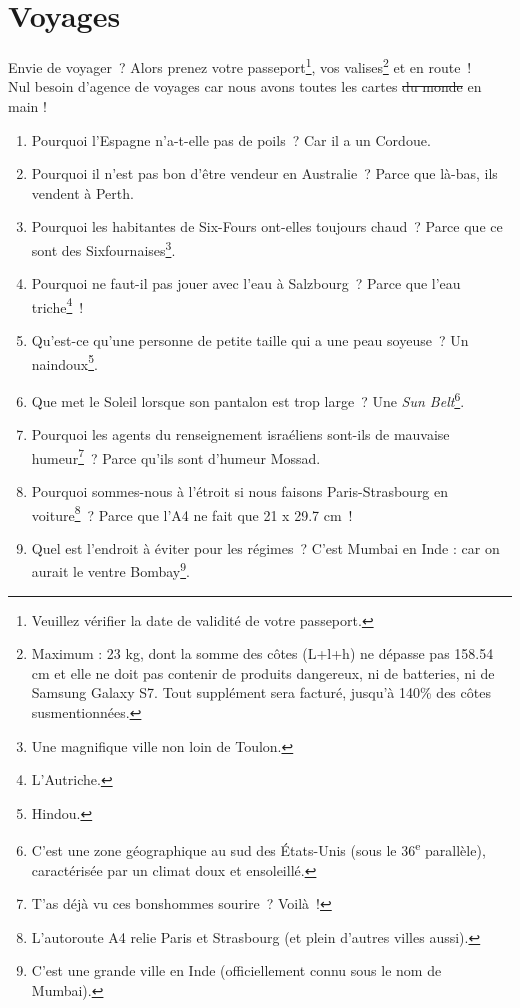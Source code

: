 \documentclass[10pt,a5paper,fullpage]{book}
\begin{document}
	\chapter{Voyages}
	Envie de voyager~? Alors prenez votre passeport\footnote{Veuillez vérifier la date de validité de votre passeport.}, vos valises\footnote{Maximum : 23 kg, dont la somme des côtes (L+l+h) ne dépasse pas 158.54 cm et elle ne doit pas contenir de produits dangereux, ni de batteries, ni de Samsung Galaxy S7. Tout supplément sera facturé, jusqu'à 140\% des côtes susmentionnées.} et en route~!
	\\Nul besoin d'agence de voyages car nous avons toutes les cartes \sout{du monde} en main ! 
	
	\newpage
	\begin{enumerate}
		\item Pourquoi l’Espagne n’a-t-elle pas de poils~? Car il a un Cordoue.
		\item Pourquoi il n'est pas bon d'être vendeur en Australie~? Parce que là-bas, ils vendent à Perth. 
		\item Pourquoi les habitantes de Six-Fours ont-elles toujours chaud~? Parce que ce sont des Sixfournaises\footnote{Une magnifique ville non loin de Toulon.}. %
		\item Pourquoi ne faut-il pas jouer avec l’eau à Salzbourg~? Parce que l’eau triche\footnote{L'Autriche.}~!
		\item Qu’est-ce qu’une personne de petite taille qui a une peau soyeuse~? Un naindoux\footnote{Hindou.}.
		\item Que met le Soleil lorsque son pantalon est trop large~? Une \textit{Sun Belt}\footnote{C'est une zone géographique au sud des États-Unis (sous le 36\textsuperscript{e} parallèle), caractérisée par un climat doux et ensoleillé.}.
		\item Pourquoi les agents du renseignement israéliens sont-ils de mauvaise humeur\footnote{T'as déjà vu ces bonshommes sourire~? Voilà~!}~? Parce qu’ils sont d’humeur Mossad.
		\item Pourquoi sommes-nous à l'étroit si nous faisons Paris-Strasbourg en voiture\footnote{L’autoroute A4 relie Paris et Strasbourg (et plein d’autres villes aussi).}~? Parce que l'A4 ne fait que 21 x 29.7 cm~!
		\item Quel est l'endroit à éviter pour les régimes~? C'est Mumbai en Inde : car on aurait le ventre Bombay\footnote{C’est une grande ville en Inde (officiellement connu sous le nom de Mumbai).}. 

\end{enumerate}
\end{document}
